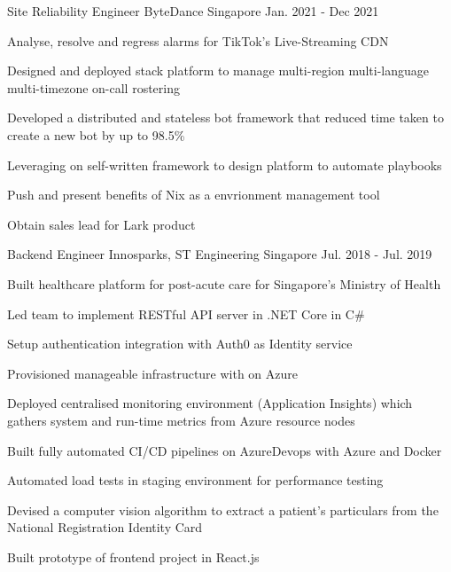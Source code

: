 \begin{cventries}
    \cventry
    {Site Reliability Engineer} %
    {ByteDance} %
    {Singapore} %
    {Jan. 2021 - Dec 2021} %
    {
    \begin{cvitems} %
        \item {Analyse, resolve and regress alarms for TikTok's Live-Streaming CDN}
        \item {Designed and deployed stack platform to manage multi-region multi-language multi-timezone on-call rostering}
        \item {Developed a distributed and stateless bot framework that reduced time taken to create a new bot by up to 98.5\%}
        \item {Leveraging on self-written framework to design platform to automate playbooks}
        \item {Push and present benefits of Nix as a envrionment management tool}
        \item {Obtain sales lead for Lark product}
    \end{cvitems}
    }

    \cventry
    {Backend Engineer} %
    {Innosparks, ST Engineering} %
    {Singapore} %
    {Jul. 2018 - Jul. 2019} %
    {
    \begin{cvitems} %
        \item {Built healthcare platform for post-acute care for Singapore's Ministry of Health }
        \item {Led team to implement RESTful API server in .NET Core in C\# }
        \item {Setup authentication integration with Auth0 as Identity service}
        \item {Provisioned manageable infrastructure with on Azure}
        \item {Deployed centralised monitoring environment (Application Insights) which gathers system and run-time metrics from Azure resource nodes}
        \item {Built fully automated CI/CD pipelines on AzureDevops with Azure and Docker}
        \item {Automated load tests in staging environment for performance testing}
        \item {Devised a computer vision algorithm to extract a patient's particulars from the National Registration Identity Card}
        \item {Built prototype of frontend project in React.js}
    \end{cvitems}
    }


\end{cventries}
